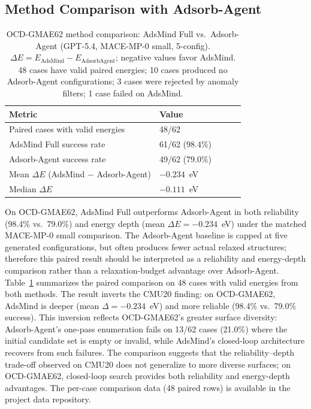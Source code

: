 \documentclass[%
 preprint,
 superscriptaddress,
 amsmath,amssymb,
 aps,
 prb,
 floatfix,
]{revtex4-2}
\begin{document}
\subsection{Method Comparison with Adsorb-Agent}

\begin{table}[ht]
\centering
\caption{OCD-GMAE62 method comparison: AdsMind Full vs.\ Adsorb-Agent (GPT-5.4, MACE-MP-0 small, 5-config). $\Delta E = E_\mathrm{AdsMind} - E_\mathrm{AdsorbAgent}$; negative values favor AdsMind. 48 cases have valid paired energies; 10 cases produced no Adsorb-Agent configurations; 3 cases were rejected by anomaly filters; 1 case failed on AdsMind.}
\label{tab:si-ocd62-adsorbagent}
\begin{tabular}{llccc}
\toprule
Metric & Value \\
\midrule
Paired cases with valid energies & 48/62 \\
AdsMind Full success rate & 61/62 (98.4\%) \\
Adsorb-Agent success rate & 49/62 (79.0\%) \\
Mean $\Delta E$ (AdsMind $-$ Adsorb-Agent) & $-0.234$~eV \\
Median $\Delta E$ & $-0.111$~eV \\
\bottomrule
\end{tabular}
\end{table}

On OCD-GMAE62, AdsMind Full outperforms Adsorb-Agent in both reliability (98.4\% vs.\ 79.0\%) and energy depth (mean $\Delta E = -0.234$~eV) under the matched MACE-MP-0 small comparison. The Adsorb-Agent baseline is capped at five generated configurations, but often produces fewer actual relaxed structures; therefore this paired result should be interpreted as a reliability and energy-depth comparison rather than a relaxation-budget advantage over Adsorb-Agent.
Table~\ref{tab:si-ocd62-adsorbagent} summarizes the paired comparison on 48 cases with valid energies from both methods. The result inverts the CMU20 finding: on OCD-GMAE62, AdsMind is deeper (mean $\Delta = -0.234$~eV) and more reliable (98.4\% vs.\ 79.0\% success). This inversion reflects OCD-GMAE62's greater surface diversity: Adsorb-Agent's one-pass enumeration fails on 13/62 cases (21.0\%) where the initial candidate set is empty or invalid, while AdsMind's closed-loop architecture recovers from such failures. The comparison suggests that the reliability--depth trade-off observed on CMU20 does not generalize to more diverse surfaces; on OCD-GMAE62, closed-loop search provides both reliability and energy-depth advantages.
The per-case comparison data (48 paired rows) is available in the project data repository.
\end{document}

